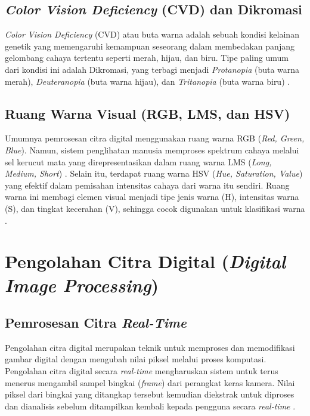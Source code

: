 \subsection{\textit{Color Vision Deficiency} (CVD) dan Dikromasi}
\textit{Color Vision Deficiency} (CVD) atau buta warna adalah sebuah kondisi kelainan genetik yang memengaruhi kemampuan seseorang dalam membedakan panjang gelombang cahaya tertentu seperti merah, hijau, dan biru.
Tipe paling umum dari kondisi ini adalah Dikromasi, yang terbagi menjadi \textit{Protanopia} (buta warna merah), \textit{Deuteranopia} (buta warna hijau), dan \textit{Tritanopia} (buta warna biru) \parencite{muhammad2020analysis}.

\subsection{Ruang Warna Visual (RGB, LMS, dan HSV)}
Umumnya pemrosesan citra digital menggunakan ruang warna RGB (\textit{Red, Green, Blue}).
Namun, sistem penglihatan manusia memproses spektrum cahaya melalui sel kerucut mata yang direpresentasikan dalam ruang warna LMS (\textit{Long, Medium, Short}) \parencite{tasnim2017}.
Selain itu, terdapat ruang warna HSV (\textit{Hue, Saturation, Value}) yang efektif dalam pemisahan intensitas cahaya dari warna itu sendiri.
Ruang warna ini membagi elemen visual menjadi tipe jenis warna (H), intensitas warna (S), dan tingkat kecerahan (V), sehingga cocok digunakan untuk klasifikasi warna \parencite{Sirisathitkul31122025}.

\section{Pengolahan Citra Digital (\textit{Digital Image Processing})}

\subsection{Pemrosesan Citra \textit{Real-Time}}
Pengolahan citra digital merupakan teknik untuk memproses dan memodifikasi gambar digital dengan mengubah nilai piksel melalui proses komputasi.
Pengolahan citra digital secara \textit{real-time} mengharuskan sistem untuk terus menerus mengambil sampel bingkai (\textit{frame}) dari perangkat keras kamera.
Nilai piksel dari bingkai yang ditangkap tersebut kemudian diekstrak untuk diproses dan dianalisis sebelum ditampilkan kembali kepada pengguna secara \textit{real-time} \parencite{samyan2015}.

